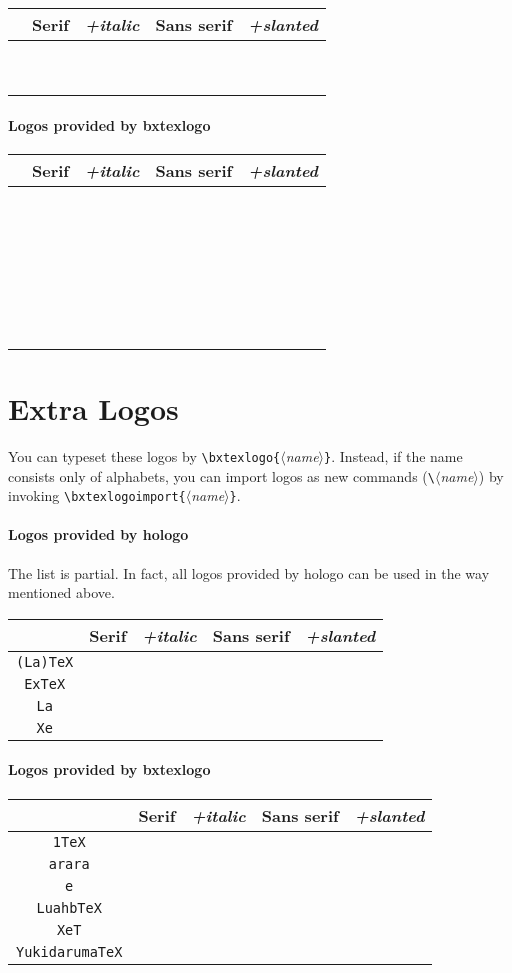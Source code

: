 \documentclass[a4paper]{article}
\newcommand{\Pkg}[1]{\textsf{#1}}
\newenvironment{LogoSamples}{%
  \begin{center}\begin{tabular}{ccccc}
    \hline \phantom{\LARGE I}
        & \textrm{Serif} & \textit{+italic}
        & \textsf{Sans serif} & \textsl{+slanted}
    \\\hline
}{%
    \hline
  \end{tabular}\end{center}
}
\newcommand*{\LSEntry}[1]{%
  \texttt{\string#1} & \textrm{#1} & \textit{#1}
      & \textsf{#1} & \textsf{\textsl{#1}}
  \\}
\newcommand*{\LSXEntry}[1]{%
  \texttt{#1} & \textrm{\bxtexlogo{#1}} & \textit{\bxtexlogo{#1}}
      & \textsf{\bxtexlogo{#1}} & \textsf{\textsl{\bxtexlogo{#1}}}
  \\}
\begin{document}
\begin{LogoSamples}
\LSEntry{\HanTheThanh}
\LSEntry{\KOMAScript}
\LSEntry{\LaTeXTeX}
\LSEntry{\NTS}
\LSEntry{\PiCTeX}
\LSEntry{\SageTeX}
\LSEntry{\SLiTeX}
\LSEntry{\teTeX}
\LSEntry{\TTH}
\end{LogoSamples}

\paragraph{Logos provided by \Pkg{bxtexlogo}}\mbox{}

\begin{LogoSamples}
\LSEntry{\ApTeX}
\LSEntry{\CSTUG}
\LSEntry{\DVIPDFMx}
\LSEntry{\HeVeA}
\LSEntry{\HiTeX}
\LSEntry{\JBibTeX}
\LSEntry{\JLaTeX}
\LSEntry{\JTeX}
\LSEntry{\KaTeX}
\LSEntry{\KET}
\LSEntry{\KETpic}
\LSEntry{\LaTeXiT}
\LSEntry{\LaTeXML}
\LSEntry{\logoAleph}
\LSEntry{\logoLambda}
\LSEntry{\logoLamed}
\LSEntry{\logoOmega}
\LSEntry{\OpTeX}
\LSEntry{\pTeXsT}
\LSEntry{\TeXXeT}
\LSEntry{\XyM}
\LSEntry{\XyMTeX}
\LSEntry{\BaSiX}
\LSEntry{\OneTeX}
\LSEntry{\SuyahTeX}
\LSEntry{\SATySFi}
\LSEntry{\TeXonLaTeX}
\end{LogoSamples}

\newpage
\section{Extra Logos}

You can typeset these logos by
\verb|\bxtexlogo{|$\langle$\emph{name}$\rangle$\verb|}|.
Instead, if the name consists only of alphabets,
you can import logos as new commands
(\verb|\|$\langle$\emph{name}$\rangle$)
by invoking
\verb|\bxtexlogoimport{|$\langle$\emph{name}$\rangle$\verb|}|.

\paragraph{Logos provided by \Pkg{hologo}}
The list is partial.
In fact, all logos provided by \Pkg{hologo} can be used
in the way mentioned above.

\begin{LogoSamples}
\LSXEntry{(La)TeX}
\LSXEntry{ExTeX}
\LSXEntry{La}
\LSXEntry{Xe}
\end{LogoSamples}

\paragraph{Logos provided by \Pkg{bxtexlogo}}\mbox{}

\begin{LogoSamples}
\LSXEntry{1TeX}
\LSXEntry{arara}
\LSXEntry{e}
\LSXEntry{LuahbTeX}
\LSXEntry{XeT}
\LSXEntry{YukidarumaTeX}
\end{LogoSamples}
\end{document}
